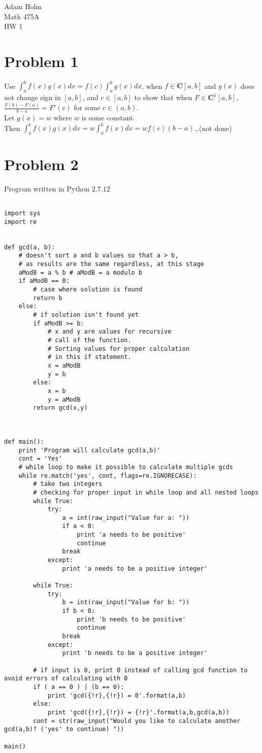 \documentclass[12pt]{article}
\begin{document}
\noindent
Adam Holm\\
Math 475A\\
HW 1

\section*{Problem 1}

Use $\int_a^b f(x)g(x)dx = f(c) \int_a^b g(x)dx$, when $f \in \mathbf{C}[a,b]$ and $g(x)$ does not change sign in $[a,b]$, and $c \in [a,b]$ to show that when $F \in \mathbf{C}^1[a,b]$, \\ $\frac{F(b)-F(a)}{b-a} = F'(c)$ for some $c \in (a,b)$. \\

\noindent
Let $g(x) = w$ where $w$ is some constant.\\
Then $\int_a^b f(x)g(x)dx = w \int_a^b f(x)dx = w f(c)(b-a)$\ldots (not done) 

\section*{Problem 2}
\noindent
Program written in Python $2.7.12$

\begin{lstlisting}

import sys
import re
	

def gcd(a, b):
	# doesn't sort a and b values so that a > b,
	# as results are the same regardless, at this stage
	aModB = a % b # aModB = a modulo b
	if aModB == 0:
		# case where solution is found
		return b
	else:
		# if solution isn't found yet
		if aModB >= b:
			# x and y are values for recursive
			# call of the function.
			# Sorting values for proper calculation
			# in this if statement.
			x = aModB
			y = b
		else:
			x = b
			y = aModB
		return gcd(x,y)
		
	

def main():
	print 'Program will calculate gcd(a,b)'
	cont = 'Yes'
	# while loop to make it possible to calculate multiple gcds
	while re.match('yes', cont, flags=re.IGNORECASE):
		# take two integers
		# checking for proper input in while loop and all nested loops
		while True:
			try:
				a = int(raw_input("Value for a: "))
				if a < 0:
					print 'a needs to be positive'
					continue
				break	
			except:
				print 'a needs to be a positive integer'
			
		while True:
			try:
				b = int(raw_input("Value for b: "))
				if b < 0:
					print 'b needs to be positive'
					continue
				break
			except:
				print 'b needs to be a positive integer'

		# if input is 0, print 0 instead of calling gcd function to avoid errors of calculating with 0
		if ( a == 0 ) | (b == 0):
			print 'gcd({!r},{!r}) = 0'.format(a,b)
		else:
			print 'gcd({!r},{!r}) = {!r}'.format(a,b,gcd(a,b))
 		cont = str(raw_input("Would you like to calculate another gcd(a,b)? ('yes' to continue) "))

main()

\end{lstlisting}
\end{document}
